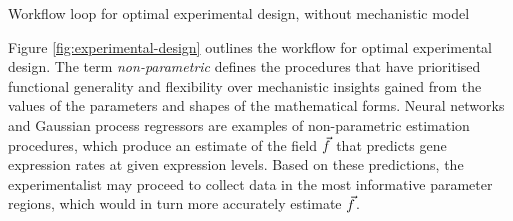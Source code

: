 \begin{Figure}
    \caption{Workflow loop for optimal experimental design, without mechanistic model}
    \label{fig:experimental-design}
\end{Figure}
\noindent
Figure \ref{fig:experimental-design} outlines the workflow for optimal experimental design.
The term \textit{non-parametric} defines the procedures that have prioritised  
functional generality and flexibility over mechanistic insights gained from the values
of the parameters and shapes of the mathematical forms. Neural networks and Gaussian process
regressors are examples of non-parametric estimation procedures, which produce an estimate
of the field $\vec{f}$ that predicts gene expression rates at given expression levels.
Based on these predictions, the experimentalist may proceed to collect data in the most
informative parameter regions, which would in turn more accurately estimate $\vec{f}$.

